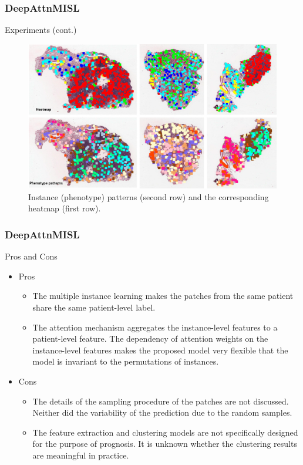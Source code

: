 \documentclass{beamer}
\begin{document}
	\begin{frame}
		\frametitle{DeepAttnMISL}
		Experiments (cont.)
		
		\begin{figure}[H]
			\centering
			\includegraphics[scale=0.13]{figures/heat2.png}
			\caption{Instance (phenotype) patterns (second row) and the corresponding heatmap (first row).}
			\label{fig:heat1}
		\end{figure}
	\end{frame}
	
	\begin{frame}
		\frametitle{DeepAttnMISL}
		Pros and Cons
		\begin{itemize}
			\item Pros
			\begin{itemize}
				\item The multiple instance learning makes the patches from the same patient share the same patient-level label.
				\item The attention mechanism aggregates the instance-level features to a patient-level feature. The dependency of attention weights on the instance-level features makes the proposed model very flexible that the model is invariant to the permutations of instances.  
			\end{itemize}
			\item Cons
			\begin{itemize}
				\item The details of the sampling procedure of the patches are not discussed. Neither did the variability of the prediction due to the random samples.
				\item The feature extraction and clustering models are not specifically designed for the purpose of prognosis. It is unknown whether the clustering results are meaningful in practice.
			\end{itemize}
		\end{itemize}
	\end{frame}
	
\end{document}

